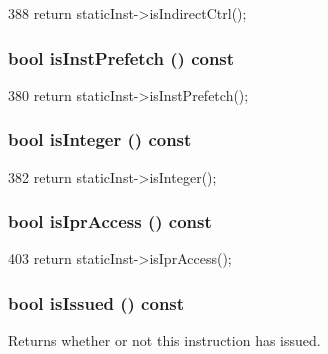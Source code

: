 \begin{DoxyCode}
388 { return staticInst->isIndirectCtrl(); }
\end{DoxyCode}
\hypertarget{classInOrderDynInst_ab7deedfb63be4690f506acd0444dde3a}{
\subsubsection[{isInstPrefetch}]{\setlength{\rightskip}{0pt plus 5cm}bool isInstPrefetch () const}}
\label{classInOrderDynInst_ab7deedfb63be4690f506acd0444dde3a}



\begin{DoxyCode}
380 { return staticInst->isInstPrefetch(); }
\end{DoxyCode}
\hypertarget{classInOrderDynInst_a06625615adfaf28305767ac42b1ef0a4}{
\subsubsection[{isInteger}]{\setlength{\rightskip}{0pt plus 5cm}bool isInteger () const}}
\label{classInOrderDynInst_a06625615adfaf28305767ac42b1ef0a4}



\begin{DoxyCode}
382 { return staticInst->isInteger(); }
\end{DoxyCode}
\hypertarget{classInOrderDynInst_aa201775c9e5befb0bf84cdd7b24519b3}{
\subsubsection[{isIprAccess}]{\setlength{\rightskip}{0pt plus 5cm}bool isIprAccess () const}}
\label{classInOrderDynInst_aa201775c9e5befb0bf84cdd7b24519b3}



\begin{DoxyCode}
403 { return staticInst->isIprAccess(); }
\end{DoxyCode}
\hypertarget{classInOrderDynInst_a1b4092ba688a1efd54c934a31dd1fd3e}{
\subsubsection[{isIssued}]{\setlength{\rightskip}{0pt plus 5cm}bool isIssued () const}}
\label{classInOrderDynInst_a1b4092ba688a1efd54c934a31dd1fd3e}
Returns whether or not this instruction has issued. 


